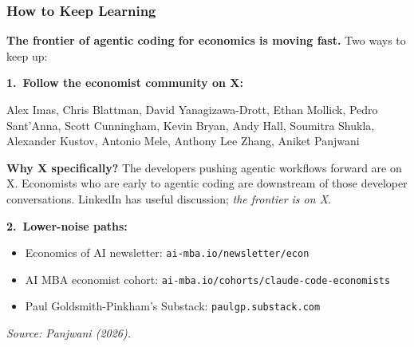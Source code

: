 \documentclass[10pt,english,aspectratio=169]{beamer}
\begin{document}
\begin{frame}
\frametitle{How to Keep Learning}

\textbf{The frontier of agentic coding for economics is moving fast.} Two ways to keep up:

\vspace{0.3cm}

\textbf{1.\ Follow the economist community on X:}

\vspace{0.1cm}

{\small
Alex Imas, Chris Blattman, David Yanagizawa-Drott, Ethan Mollick, Pedro Sant'Anna, Scott Cunningham, Kevin Bryan, Andy Hall, Soumitra Shukla, Alexander Kustov, Antonio Mele, Anthony Lee Zhang, Aniket Panjwani
}

\vspace{0.2cm}

\textbf{Why X specifically?} The developers pushing agentic workflows forward are on X. Economists who are early to agentic coding are downstream of those developer conversations. LinkedIn has useful discussion; \textit{the frontier is on X.}

\vspace{0.3cm}

\textbf{2.\ Lower-noise paths:}
\begin{itemize}
    \item Economics of AI newsletter: \texttt{ai-mba.io/newsletter/econ}
    \item AI MBA economist cohort: \texttt{ai-mba.io/cohorts/claude-code-economists}
    \item Paul Goldsmith-Pinkham's Substack: \texttt{paulgp.substack.com}
\end{itemize}

\vspace{0.1cm}

\textit{Source: Panjwani (2026).}
\end{frame}
\end{document}
